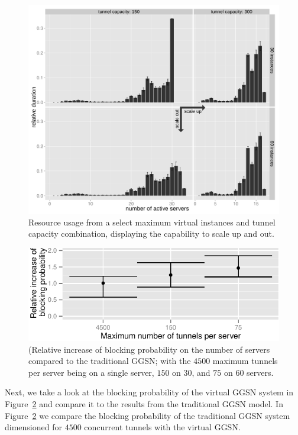 \begin{figure}[htb]
  \centering
  \includegraphics[width=1.0\textwidth]{images/R-virtualized-instanceuse-barplot.pdf}
  \caption{Resource usage from a select maximum virtual instances and tunnel capacity combination, displaying the capability to scale up and out.}
 \label{c4:fig:res-usage-barplot}
\end{figure}



\begin{figure}[htb]
  \centering
  \includegraphics{images/blocking-comparison.pdf}
  \caption{(Relative increase of blocking probability on the number of servers compared to the traditional \gls{GGSN}; with the $4500$ maximum tunnels per server being on a single server, $150$ on $30$, and $75$ on $60$ servers.}
 \label{c4:fig:blocking-comparison}
\end{figure}

Next, we take a look at the blocking probability of the virtual \gls{GGSN} system in Figure~\ref{c4:fig:blocking-comparison} and compare it to the results from the traditional \gls{GGSN} model. In Figure~\ref{c4:fig:blocking-comparison} we compare the blocking probability of the traditional \gls{GGSN} system dimensioned for $4500$ concurrent tunnels with the virtual \gls{GGSN}.

